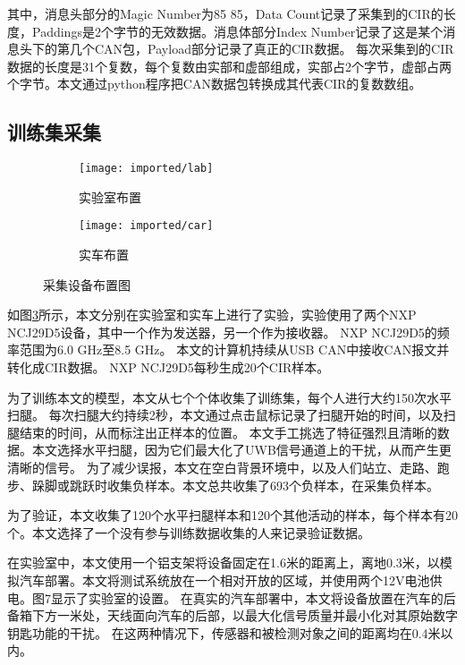 其中，消息头部分的Magic Number为85 85，Data Count记录了采集到的CIR的长度，Paddings是2个字节的无效数据。消息体部分Index Number记录了这是某个消息头下的第几个CAN包，Payload部分记录了真正的CIR数据。
每次采集到的CIR数据的长度是31个复数，每个复数由实部和虚部组成，实部占2个字节，虚部占两个字节。本文通过python程序把CAN数据包转换成其代表CIR的复数数组。

\subsection{训练集采集}
\begin{figure}[htbp]
    \centering
    \begin{subfigure}{0.45\textwidth}
        \centering
        \texttt{[image: imported/lab]}
        \caption{\label{fig:lab}实验室布置}
    \end{subfigure}%
    \centering
    \begin{subfigure}{0.45\textwidth}
        \centering
        \texttt{[image: imported/car]}
        \caption{\label{fig:car}实车布置}
    \end{subfigure}%
    \caption{采集设备布置图}
    \label{fig:lab_car_setup}
\end{figure}
如图\ref{fig:lab_car_setup}所示，本文分别在实验室和实车上进行了实验，实验使用了两个NXP NCJ\-29D5设备，其中一个作为发送器，另一个作为接收器。
NXP NCJ29D5的频率范围为6.0 GHz至8.5 GHz。
本文的计算机持续从USB CAN中接收CAN报文并转化成CIR数据。
NXP NCJ29D5每秒生成20个CIR样本。

为了训练本文的模型，本文从七个个体收集了训练集，每个人进行大约150次水平扫腿。
每次扫腿大约持续2秒，本文通过点击鼠标记录了扫腿开始的时间，以及扫腿结束的时间，从而标注出正样本的位置。
本文手工挑选了特征强烈且清晰的数据。本文选择水平扫腿，因为它们最大化了UWB信号通道上的干扰，从而产生更清晰的信号。
为了减少误报，本文在空白背景环境中，以及人们站立、走路、跑步、跺脚或跳跃时收集负样本。本文总共收集了693个负样本，在采集负样本。

为了验证，本文收集了120个水平扫腿样本和120个其他活动的样本，每个样本有20个。本文选择了一个没有参与训练数据收集的人来记录验证数据。

在实验室中，本文使用一个铝支架将设备固定在1.6米的距离上，离地0.3米，以模拟汽车部署。本文将测试系统放在一个相对开放的区域，并使用两个12V电池供电。图7显示了实验室的设置。
在真实的汽车部署中，本文将设备放置在汽车的后备箱下方一米处，天线面向汽车的后部，以最大化信号质量并最小化对其原始数字钥匙功能的干扰。
在这两种情况下，传感器和被检测对象之间的距离均在0.4米以内。

